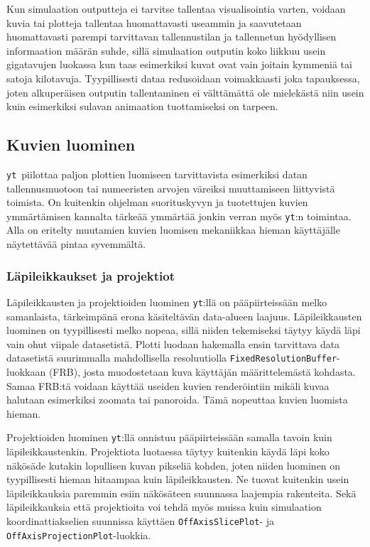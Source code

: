 \documentclass[12pt,a4paper]{article}
\newcommand{\yt}{\texttt{yt}}
\begin{document}
Kun simulaation outputteja ei tarvitse tallentaa visualisointia varten, voidaan kuvia tai plotteja tallentaa huomattavasti useammin ja saavutetaan huomattavasti parempi tarvittavan tallennustilan ja tallennetun hyödyllisen informaation määrän suhde, sillä simulaation outputin koko liikkuu usein gigatavujen luokassa kun taas esimerkiksi kuvat ovat vain joitain kymmeniä tai satoja kilotavuja. Tyypillisesti dataa redusoidaan voimakkaasti joka tapauksessa, joten alkuperäisen outputin tallentaminen ei välttämättä ole mielekästä niin usein kuin esimerkiksi sulavan animaation tuottamiseksi on tarpeen. \cite{yt}

\subsection{Kuvien luominen}
\yt\ piilottaa paljon plottien luomiseen tarvittavista esimerkiksi datan tallennusmuotoon tai numeeristen arvojen väreiksi muuttamiseen liittyvistä toimista. On kuitenkin ohjelman suorituskyvyn ja tuotettujen kuvien ymmärtämisen kannalta tärkeää ymmärtää jonkin verran myös \yt :n toimintaa. Alla on eritelty muutamien kuvien luomisen mekaniikkaa hieman käyttäjälle näytettävää pintaa syvemmältä.

\subsubsection{Läpileikkaukset ja projektiot}
Läpileikkausten ja projektioiden luominen \yt :llä on pääpiirteissään melko samanlaista, tärkeimpänä erona käsiteltävän data-alueen laajuus. Läpi\-leikkausten luominen on tyypillisesti melko nopeaa, sillä niiden tekemiseksi täytyy käydä läpi vain ohut viipale datasetistä. Plotti luodaan hakemalla ensin tarvittava data datasetistä suurimmalla mahdollisella resoluutiolla \texttt{Fixed\-Resolution\-Buffer}-luokkaan (FRB), josta muodostetaan kuva käyttäjän määrittelemästä kohdasta. Samaa FRB:tä voidaan käyttää useiden kuvien renderöintiin mikäli kuvaa halutaan esimerkiksi zoomata tai panoroida. Tämä nopeuttaa kuvien luomista hieman. \cite{sliceproj}

\begin{sloppypar}Projektioiden luominen \yt :llä onnistuu pääpiirteissään samalla tavoin kuin läpi\-leik\-kaus\-ten\-kin. Projektiota luotaessa täytyy kuitenkin käydä läpi koko näkösäde kutakin lopullisen kuvan pikseliä kohden, joten niiden luominen on tyypillisesti hieman hitaampaa kuin läpi\-leikkausten. Ne tuovat kuitenkin usein läpileikkauksia paremmin esiin näkösäteen suunnassa laajempia rakenteita. Sekä läpileikkauksia että projektioita voi tehdä myös muissa kuin simulaation koordinattiakselien suunnissa käyttäen \texttt{OffAxisSlicePlot}- ja \texttt{OffAxisProjectionPlot}-luokkia. \cite{sliceproj}
\end{sloppypar}
\end{document}
